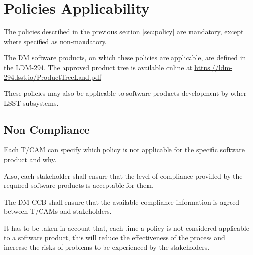 \newpage
\section{Policies Applicability} \label{sec:applicability}

The policies described in the previous section \ref{sec:policy} are mandatory, except where specified as non-mandatory.

The \gls{DM} software products, on which these policies are applicable, are defined in the LDM-294.
The approved product tree is available online at \url{https://ldm-294.lsst.io/ProductTreeLand.pdf}

These policies may also be applicable to software products development by other \gls{LSST} subsystems.


\subsection{Non Compliance} \label{sec:noncompliance}

Each T/CAM can specify which policy is not applicable for the specific software product and why.

Also, each stakeholder shall ensure that the level of compliance provided by the required software products is acceptable for them.

The DM-CCB shall ensure that the available compliance information is agreed between T/CAMs and stakeholders.

It has to be taken in account that, each time a policy is not considered applicable to a software product, this will reduce the effectiveness of the process and increase the risks of problems to be experienced by the stakeholders.
